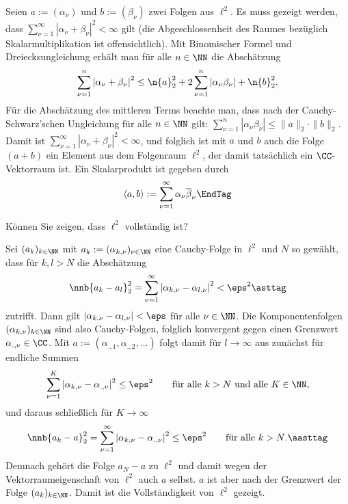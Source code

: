 \begin{antwort}
  Seien  
  $a:= (\alpha_\nu)$ und $b := ( \beta_\nu )$ zwei Folgen aus $\ell^2$. 
  Es muss gezeigt werden, dass $\sum_{\nu=1}^\infty 
  | \alpha_\nu + \beta_\nu |^2 < \infty$ gilt (die Abgeschlossenheit 
  des Raumes bezüglich Skalarmultiplikation ist offensichtlich). 
  Mit Binomischer Formel und Dreiecksungleichung erhält man für alle 
  $n\in\NN$ die Abschätzung  
  \[
  \sum_{\nu=1}^n \left| \alpha_\nu + \beta_\nu \right|^2  
  \le 
  \n{ a }_2^2 + 2 \sum_{\nu=1}^n \left| \alpha_\nu \beta_\nu \right| 
  +
  \n{ b }_2^2. 
  \]
  Für die Abschätzung des mittleren Terms 
  beachte man, dass nach der Cauchy-Schwarz'schen Ungleichung 
  für alle $n\in \NN$ gilt: 
  $ \sum_{\nu=1}^n \left| \alpha_\nu \beta_\nu \right|  \le 
  \| a \|_2 \cdot \| b \|_2$. Damit ist 
  $\sum_{\nu=1}^\infty \left| \alpha_\nu + \beta_\nu \right|^2 < \infty$, 
  und folglich ist mit $a$ und $b$ auch die Folge $(a+b)$ 
  ein Element aus dem Folgenraum $\ell^2$, 
  der damit tatsächlich ein $\CC$-Vektorraum ist. 
  Ein Skalarprodukt ist gegeben durch
  \[
  \langle a, b \rangle := \sum_{\nu=1}^\infty \alpha_\nu \overline{\beta}_\nu 
  \EndTag
  \]
\end{antwort}

\begin{frage}
  Können Sie zeigen, dass $\ell^2$ vollständig ist?
\end{frage}

\begin{antwort}
  Sei $(a_k)_{k\in \NN}$ mit 
  $a_k := (\alpha_{k,\nu})_{\nu\in \NN}$ eine Cauchy-Folge in $\ell^2$ 
  und $N$ so gewählt, dass für $k,l>N$ die Abschätzung 
  \begin{equation}
    \nnb{ a_k - a_l }_2^2  = \sum_{\nu=1}^\infty 
    \left| \alpha_{k,\nu} - \alpha_{l,\nu} \right|^2 < \eps^2
    \asttag
  \end{equation}
  zutrifft. Dann gilt 
  $\left| \alpha_{k,\nu} - \alpha_{l,\nu} \right| < \eps$ 
  für alle $\nu\in \NN$. Die Komponentenfolgen 
  $(\alpha_{k,\nu})_{k\in \NN}$ sind also Cauchy-Folgen, 
  folglich konvergent gegen einen Grenzwert $\alpha_{.,\nu} \in \CC$. 
  Mit $a := ( \alpha_{.,1}, \alpha_{.,2},\ldots )$  folgt damit 
  für  $l\to \infty$ aus {\astref} zunächst für endliche Summen 
  \begin{equation}
    \sum_{\nu=1}^K 
    \left| \alpha_{k,\nu} - \alpha_{.,\nu} \right|^2 \le \eps^2 
    \qquad\text{für alle $k > N$ und alle $K\in \NN$},
    \notag
  \end{equation}
  und daraus schließlich für $K\to\infty$
  \begin{equation}
    \nnb{ a_k - a }_2^2  = \sum_{\nu=1}^\infty 
    \left| \alpha_{k,\nu} - \alpha_{.,\nu} \right|^2 \le \eps^2 
    \qquad\text{für alle $k > N$}.
    \aasttag
  \end{equation}
  Demnach gehört die Folge $a_N-a$ zu $\ell^2$ und damit wegen 
  der Vektorraumeigenschaft von $\ell^2$ auch $a$ selbst. 
  $a$ ist aber nach {\astastref} der Grenzwert der Folge 
  $(a_k)_{k\in \NN}$. Damit ist die Vollständigkeit von $\ell^2$ gezeigt.
  \AntEnd 
\end{antwort}

